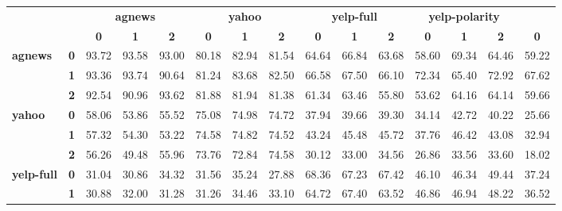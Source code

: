 
\begin{table*}[ht]
	\centering
	\fontsize{8}{12}
	\selectfont
	\begin{tabular}{llccccccccccccc}
		\toprule
		&            & \multicolumn{3}{c}{\textbf{agnews}}  & \multicolumn{3}{c}{\textbf{yahoo}}   & \multicolumn{3}{c}{\textbf{yelp-full}} & \multicolumn{3}{c}{\textbf{yelp-polarity}} \\
		&            & \textbf{0} & \textbf{1} & \textbf{2} & \textbf{0} & \textbf{1} & \textbf{2} & \textbf{0}  & \textbf{1}  & \textbf{2} & \textbf{0}   & \textbf{1}   & \textbf{2}   & \textbf{0} \\
		\hline
		\multirow{3}{*}{\textbf{agnews}}        & \textbf{0} & 93.72      & 93.58      & 93.00      & 80.18      & 82.94      & 81.54      & 64.64       & 66.84       & 63.68      & 58.60        & 69.34        & 64.46        & 59.22      \\
		& \textbf{1} & 93.36      & 93.74      & 90.64      & 81.24      & 83.68      & 82.50      & 66.58       & 67.50       & 66.10      & 72.34        & 65.40        & 72.92        & 67.62      \\
		& \textbf{2} & 92.54      & 90.96      & 93.62      & 81.88      & 81.94      & 81.38      & 61.34       & 63.46       & 55.80      & 53.62        & 64.16        & 64.14        & 59.66      \\
		\hline
		\multirow{3}{*}{\textbf{yahoo}}         & \textbf{0} & 58.06      & 53.86      & 55.52      & 75.08      & 74.98      & 74.72      & 37.94       & 39.66       & 39.30      & 34.14        & 42.72        & 40.22        & 25.66      \\
		& \textbf{1} & 57.32      & 54.30      & 53.22      & 74.58      & 74.82      & 74.52      & 43.24       & 45.48       & 45.72      & 37.76        & 46.42        & 43.08        & 32.94      \\
		& \textbf{2} & 56.26      & 49.48      & 55.96      & 73.76      & 72.84      & 74.58      & 30.12       & 33.00       & 34.56      & 26.86        & 33.56        & 33.60        & 18.02      \\
		\hline
		\multirow{3}{*}{\textbf{yelp-full}}     & \textbf{0} & 31.04      & 30.86      & 34.32      & 31.56      & 35.24      & 27.88      & 68.36       & 67.23       & 67.42      & 46.10        & 46.34        & 49.44        & 37.24      \\
		& \textbf{1} & 30.88      & 32.00      & 31.28      & 31.26      & 34.46      & 33.10      & 64.72       & 67.40       & 63.52      & 46.86        & 46.94        & 48.22        & 36.52      \\

\end{tabular}
\end{table*}
